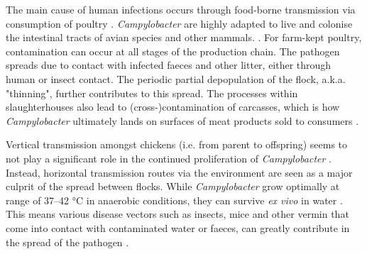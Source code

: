 

The main cause of human infections occurs through food-borne transmission via consumption of poultry \parencite{wilson_tracing_2008}. \textit{Campylobacter} are highly adapted to live and colonise the intestinal tracts of avian species and other mammals. \parencite{saif_diseases_2008}. For farm-kept poultry, contamination can occur at all stages of the production chain. The pathogen spreads due to contact with infected faeces and other litter, either through human or insect contact. The periodic partial depopulation of the flock, a.k.a. "thinning", further contributes to this spread. The processes within slaughterhouses also lead to (cross-)contamination of carcasses, which is how \textit{Campylobacter} ultimately lands on surfaces of meat products sold to consumers \parencite{skarp_campylobacteriosis_2015}.

Vertical transmission amongst chickens (i.e. from parent to offspring) seems to not play a significant role in the continued proliferation of \textit{Campylobacter} \parencite{callicott_lack_2006}. Instead, horizontal transmission routes via the environment are seen as a major culprit of the spread between flocks. While \textit{Campylobacter} grow optimally at range of 37–42 °C in anaerobic conditions, they can survive \textit{ex vivo} in water \parencite{wilson_tracing_2008}. This means various disease vectors such as insects, mice and other vermin that come into contact with contaminated water or faeces, can greatly contribute in the spread of the pathogen \parencite{newell_sources_2003}.


